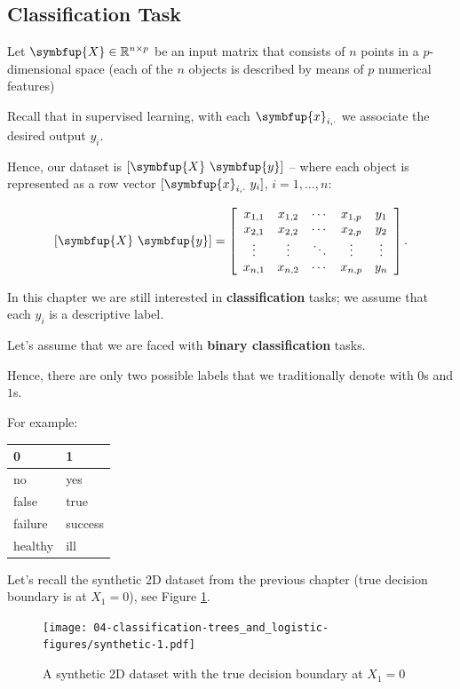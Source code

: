 \documentclass[10pt,b5paper,krantz1]{krantz}
\renewcommand{\mathbf}[1]{\symbfup{#1}}
\begin{document}
\hypertarget{classification-task-1}{%
\subsection{Classification Task}\label{classification-task-1}}

Let \(\mathbf{X}\in\mathbb{R}^{n\times p}\) be an input matrix
that consists of \(n\) points in a \(p\)-dimensional space (each of the \(n\) objects
is described by means of \(p\) numerical features)

Recall that in supervised learning, with each
\(\mathbf{x}_{i,\cdot}\) we associate the desired output \(y_i\).

Hence, our dataset is \([\mathbf{X}\ \mathbf{y}]\) --
where each object is represented as a row vector
\([\mathbf{x}_{i,\cdot}\ y_i]\), \(i=1,\dots,n\):

\[
[\mathbf{X}\ \mathbf{y}]=
\left[
\begin{array}{ccccc}
x_{1,1} & x_{1,2} & \cdots & x_{1,p} & y_1\\
x_{2,1} & x_{2,2} & \cdots & x_{2,p} & y_2\\
\vdots & \vdots & \ddots & \vdots    & \vdots\\
x_{n,1} & x_{n,2} & \cdots & x_{n,p} & y_n\\
\end{array}
\right].
\]

\bigskip

In this chapter we are still interested in \textbf{classification} tasks;
we assume that each \(y_i\) is a descriptive label.

Let's assume that we are faced with \textbf{binary classification} tasks.

Hence, there are only two possible labels that we traditionally denote with \(0\)s and \(1\)s.

For example:

\begin{longtable}[]{@{}ll@{}}
\toprule
0 & 1\tabularnewline
\midrule
\endhead
no & yes\tabularnewline
false & true\tabularnewline
failure & success\tabularnewline
healthy & ill\tabularnewline
\bottomrule
\end{longtable}

Let's recall the synthetic 2D dataset from the previous chapter
(true decision boundary is at \(X_1=0\)), see Figure \ref{fig:synthetic}.

\begin{figure}
\hypertarget{fig:synthetic}{%
\centering
\texttt{[image: 04-classification-trees\_and\_logistic-figures/synthetic-1.pdf]}
\caption{A synthetic 2D dataset with the true decision boundary at \(X_1=0\)}\label{fig:synthetic}
}
\end{figure}
\end{document}
